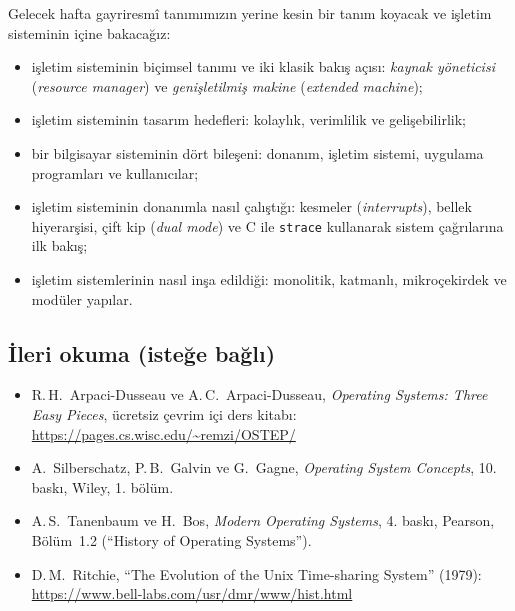 \documentclass[11pt,a4paper]{article}
\newcommand{\cmd}[1]{\texttt{#1}}
\begin{document}
Gelecek hafta gayriresmî tanımımızın yerine kesin bir tanım koyacak ve işletim sisteminin içine bakacağız:
\begin{itemize}
  \item işletim sisteminin biçimsel tanımı ve iki klasik bakış açısı: \emph{kaynak yöneticisi} (\emph{resource manager}) ve \emph{genişletilmiş makine} (\emph{extended machine});
  \item işletim sisteminin tasarım hedefleri: kolaylık, verimlilik ve gelişebilirlik;
  \item bir bilgisayar sisteminin dört bileşeni: donanım, işletim sistemi, uygulama programları ve kullanıcılar;
  \item işletim sisteminin donanımla nasıl çalıştığı: kesmeler (\emph{interrupts}), bellek hiyerarşisi, çift kip (\emph{dual mode}) ve C ile \cmd{strace} kullanarak sistem çağrılarına ilk bakış;
  \item işletim sistemlerinin nasıl inşa edildiği: monolitik, katmanlı, mikroçekirdek ve modüler yapılar.
\end{itemize}

\subsection*{İleri okuma (isteğe bağlı)}
\begin{itemize}
  \item R.\,H.\ Arpaci-Dusseau ve A.\,C.\ Arpaci-Dusseau, \emph{Operating Systems: Three Easy Pieces}, ücretsiz çevrim içi ders kitabı: \url{https://pages.cs.wisc.edu/~remzi/OSTEP/}
  \item A.\ Silberschatz, P.\,B.\ Galvin ve G.\ Gagne, \emph{Operating System Concepts}, 10. baskı, Wiley, 1. bölüm.
  \item A.\,S.\ Tanenbaum ve H.\ Bos, \emph{Modern Operating Systems}, 4. baskı, Pearson, Bölüm~1.2 (``History of Operating Systems'').
  \item D.\,M.\ Ritchie, ``The Evolution of the Unix Time-sharing System'' (1979): \url{https://www.bell-labs.com/usr/dmr/www/hist.html}
\end{itemize}
\end{document}

